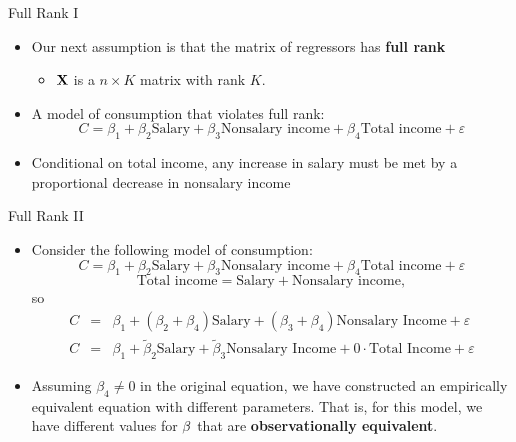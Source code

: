 \documentclass[aspectratio=169,11pt]{beamer}
\begin{document}
\begin{frame}{Full Rank I}
\begin{itemize}

	\item<1-> Our next assumption is that the matrix of regressors has {\bf full rank}
	\begin{itemize}
		\item<1-> ${\bf X}$ is a $n\times K$ matrix with rank $K$.
	\end{itemize}

	\medskip
	\item<2-> A model of consumption that violates full rank:\[ 
	C = \beta_1 + \beta_2 \text{Salary} + \beta_3 \text{Nonsalary income} + \beta_4 \text{Total income} + \varepsilon
	\]

	\medskip
	\item<3-> Conditional on total income, any increase in salary must be met by a proportional decrease
	in nonsalary income


\end{itemize}
\end{frame}

\begin{frame}{Full Rank II}
\begin{itemize}

	\item Consider the following model of consumption:\[ 
	C = \beta_1 + \beta_2 \text{Salary} + \beta_3 \text{Nonsalary income} + \beta_4 \text{Total income} + \varepsilon
	\]
	\smallskip
\[
	\text{Total income}  = \text{Salary} + \text{Nonsalary income},
	\]
	so\[
\begin{array}{ccl}
C & = & \beta_{1}+\left(\beta_{2}+\beta_{4}\right)\text{Salary}+\left(\beta_{3}+\beta_{4}\right)\text{Nonsalary Income}+\varepsilon\\
C & = & \beta_{1}+\widetilde{\beta}_{2}\text{Salary}+\widetilde{\beta}_{3}\text{Nonsalary Income}+0\cdot\text{Total Income}+\varepsilon
\end{array}
\]

	\smallskip
	\item Assuming $\beta_{4}\ne 0$ in the original equation, we have constructed an empirically equivalent equation with different parameters.
         That is, for this model, we have different values for ${\bold \beta }$ that are {\bf observationally equivalent}. 

\end{itemize}
\end{frame}
\end{document}
